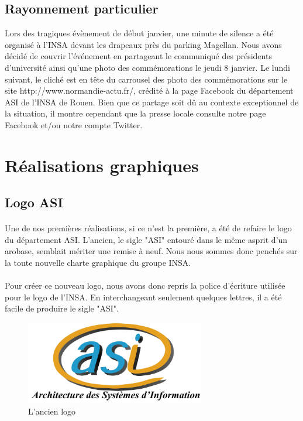 \subsection{Rayonnement particulier}

Lors des tragiques évènement de début janvier, une minute de silence a été organisé à l'INSA devant les drapeaux près du parking Magellan. Nous avons décidé de couvrir l'événement en partageant le communiqué des présidents d'université ainsi qu'une photo des commémorations le jeudi 8 janvier. 
Le lundi suivant, le cliché est en tête du carrousel des photo des commémorations sur le site http://www.normandie-actu.fr/, crédité à la page Facebook du département ASI de l'INSA de Rouen.
Bien que ce partage soit dû au contexte exceptionnel de la situation, il montre cependant que la presse locale consulte notre page Facebook et/ou notre compte Twitter.

\section{Réalisations graphiques}
	\subsection{Logo ASI}

		\paragraph{}
		Une de nos premières réalisations, si ce n'est la première, a été de refaire le logo du département ASI. L'ancien, le sigle "ASI" entouré dans le même asprit d'un arobase, semblait mériter une remise à 
		neuf. Nous nous sommes donc penchés sur la toute nouvelle charte graphique du groupe INSA. 
		
		\paragraph{}
		Pour créer ce nouveau logo, nous avons donc repris la police d'écriture utilisée pour le logo de l'INSA. En interchangeant seulement quelques lettres, il a été facile de produire le sigle "ASI". 
		
		\begin{figure}
			\begin{center}
				\includegraphics[width=0.7\textwidth]{images/ancienlogo.png}
				\caption{L'ancien logo}
			\end{center}
		\end{figure}
		
